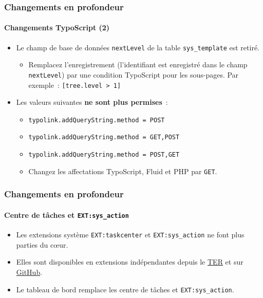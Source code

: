 \begin{frame}[fragile]
	\frametitle{Changements en profondeur}
	\framesubtitle{Changements TypoScript (2)}

	\begin{itemize}
		\item Le champ de base de données \texttt{nextLevel} de la table
			\texttt{sys\_template} est retiré.

			\begin{itemize}\smaller
				\item[\ding{228}] Remplacez l'enregistrement (l'identifiant est enregistré dans le champ
					\texttt{nextLevel}) par une condition TypoScript pour les sous-pages.
					Par exemple~: \texttt{[tree.level > 1]}
			\end{itemize}\normalsize

		\item Les valeurs suivantes \textbf{ne sont plus permises}~:

			\begin{itemize}\smaller
				\item \texttt{typolink.addQueryString.method = POST}
				\item \texttt{typolink.addQueryString.method = GET,POST}
				\item \texttt{typolink.addQueryString.method = POST,GET}
			\end{itemize}\normalsize

			\begin{itemize}\smaller
				\item[\ding{228}] Changez les affectations TypoScript, Fluid et PHP par \texttt{GET}.
			\end{itemize}\normalsize

	\end{itemize}

\end{frame}


\begin{frame}[fragile]
	\frametitle{Changements en profondeur}
	\framesubtitle{Centre de tâches et \texttt{EXT:sys\_action}}

	\begin{itemize}

		\item Les extensions système \texttt{EXT:taskcenter} et \texttt{EXT:sys\_action}
			ne font plus parties du cœur.

		\item Elles sont disponibles en extensions indépendantes depuis le
			\href{https://extensions.typo3.org/}{TER}
			et sur \href{https://github.com/FriendsOfTYPO3}{GitHub}.

		\item Le tableau de bord remplace les centre de tâches et \texttt{EXT:sys\_action}.

	\end{itemize}

\end{frame}

